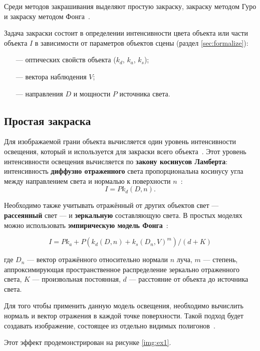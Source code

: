 Среди методов закрашивания выделяют простую закраску, закраску методом Гуро и закраску методом Фонга~\cite{rodjers}.

Задача закраски состоит в определении интенсивности цвета объекта или части объекта $I$ в зависимости от параметров объектов сцены (раздел \ref{sec:formalize}):
\begin{itemize}
	\item[---] оптических свойств объекта ($k_d$, $k_a$, $k_s$);
	\item[---] вектора наблюдения $V$;
	\item[---] направления $D$ и мощности $P$ источника света.
\end{itemize}

\subsection{Простая закраска}

Для изображаемой грани объекта вычисляется один уровень интенсивности освещения, который и используется для закраски всего объекта~\cite{rodjers}. Этот уровень интенсивности освещения вычисляется по \textbf{закону косинусов Ламберта}: интенсивность \textbf{диффузно отраженного} света пропорциональна косинусу угла между направлением света и нормалью к поверхности $n$~\cite{rodjers, light}: 
\begin{equation}
I = P k_d (D, n).
\end{equation}

Необходимо также учитывать отражённый от других объектов свет --- \textbf{рассеянный} свет --- и \textbf{зеркальную} составляющую света. В простых моделях можно использовать \textbf{эмпирическую модель Фонга}~\cite{rodjers, light}:

\begin{equation}
	I =  P k_a + P (k_d (D, n) + k_s (D_n, V)^m ) / (d + K)
\end{equation}

где $D_n$ --- вектор отражённого относительно нормали $n$ луча, $m$ --- степень, аппроксимирующая пространственное распределение зеркально отраженного света, $K$ --- произвольная постоянная, $d$ --- расстояние от объекта до источника света.

Для того чтобы применить данную модель освещения, необходимо вычислить нормаль и вектор отражения в каждой точке поверхности. Такой подход будет создавать изображение, состоящее из отдельно видимых полигонов~\cite{rodjers, light}.

Этот эффект продемонстрирован на рисунке \ref{img:ex1}.

